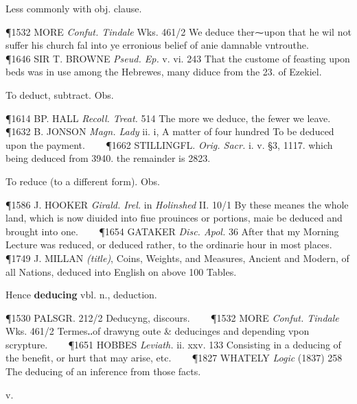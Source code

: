 \begin{description}[wide, labelwidth=!, labelindent=0pt]
\begin{myenumerate}
 Less commonly with obj. clause.

\P 1532 MORE  \textit{Confut. Tindale} Wks. 461/2 We deduce ther⁓upon that he wil not suffer his church fal into ye erronious belief of anie damnable vntrouthe.    
\P 1646 SIR T. BROWNE  \textit{Pseud. Ep.} v. vi. 243 That the custome of feasting upon beds was in use among the Hebrewes, many diduce from the 23. of Ezekiel.

 To deduct, subtract. Obs.

\P 1614 BP. HALL  \textit{Recoll. Treat.} 514 The more we deduce, the fewer we leave.    
\P 1632 B. JONSON  \textit{Magn. Lady} ii. i, A matter of four hundred To be deduced upon the payment.    
\P 1662 STILLINGFL.  \textit{Orig. Sacr.} i. v. §3, 1117. which being deduced from 3940. the remainder is 2823.

 To reduce (to a different form). Obs.

\P 1586 J. HOOKER  \textit{Girald. Irel.} in \textit{Holinshed} II. 10/1 By these meanes the whole land, which is now diuided into fiue prouinces or portions, maie be deduced and brought into one.    
\P 1654 GATAKER  \textit{Disc. Apol.} 36 After that my Morning Lecture was reduced, or deduced rather, to the ordinarie hour in most places.    
\P 1749 J. MILLAN  \textit{(title)}, Coins, Weights, and Measures, Ancient and Modern, of all Nations, deduced into English on above 100 Tables.

\noindent Hence \textbf{deducing} vbl. n., deduction.

\P 1530 PALSGR. 212/2 Deducyng, discours.    
\P 1532 MORE  \textit{Confut. Tindale} Wks. 461/2 Termes‥of drawyng oute \& deducinges and depending vpon scrypture.    
\P 1651 HOBBES  \textit{Leviath.} ii. xxv. 133 Consisting in a deducing of the benefit, or hurt that may arise, etc.    
\P 1827 WHATELY  \textit{Logic} (1837) 258 The deducing of an inference from those facts.
\end{myenumerate}

 v.

\noindent {}

\vspace{-0.3cm}


\end{description}
